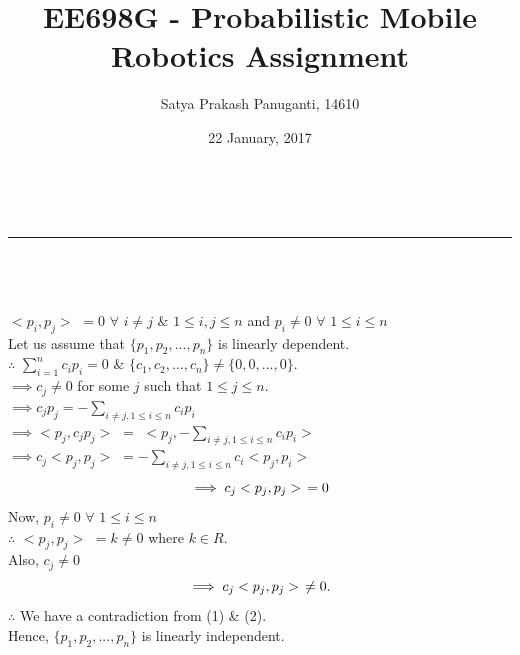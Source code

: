 \documentclass[a4paper,fleqn,11pt]{article}
\makeatletter
\newcommand{\linia}{\rule{\linewidth}{0.5pt}}
\theoremstyle{mytheor}
\renewcommand{\maketitle}{
\begin{center}
\vspace{2ex}
{\huge \textsc{\@title}}
\vspace{1ex}
\\
\linia\\
\@author \hfill \@date
\vspace{4ex}
\end{center}
}
\makeatother
\begin{document}
\title{EE698G - Probabilistic Mobile Robotics Assignment}

\author{Satya Prakash Panuganti, 14610}

\date{22 January, 2017}

\maketitle

\section{}
$<p_{i}, p_{j}>$ $= 0$ $\forall$ $i \neq j$ $\&$ $1 \leqslant i, j \leqslant n$ and $p_{i} \neq 0$ $\forall$ $1 \leqslant i \leqslant n$ \\
Let us assume that $\{p_{1}, p_{2}, ... , p_{n}\}$ is linearly dependent. \\
$\therefore$ \hspace{2ex}$ \sum_{i=1}^{n} c_{i}p_{i} = 0$ $\&$ $\{c_{1}, c_{2}, ... , c_{n}\} \neq \{0, 0, ... , 0\}.$ \\
$\implies c_{j} \neq 0$ for some $j$ such that $1 \leqslant j \leqslant n.$ \\
$\implies c_{j}p_{j} = - \sum_{i \neq j, 1 \leqslant i \leqslant n} c_{i}p_{i}$ \\
$\implies <p_{j}, c_{j}p_{j}>$ $=$ $<p_{j}, - \sum_{i \neq j, 1 \leqslant i \leqslant n} c_{i}p_{i}>$ \\
$\implies c_{j}<p_{j}, p_{j}>$ $= - \sum_{i \neq j, 1 \leqslant i \leqslant n} c_{i}<p_{j}, p_{i}>$
\begin{equation}
\implies c_{j}<p_{j}, p_{j}> \hspace{1ex} = 0
\end{equation}
Now, $p_{i} \neq 0$ $\forall$ $1 \leqslant i \leqslant n$ \\
$\therefore$ $<p_{j}, p_{j}>$ $= k \neq 0$ where $k \in \!R.$ \\
Also, $c_{j} \neq 0$ 
\begin{equation}
\implies c_{j}<p_{j}, p_{j}> \hspace{1ex} \neq 0.
\end{equation}
$\therefore$ We have a contradiction from (1) \& (2).\\
Hence, $\{p_{1}, p_{2}, ... , p_{n}\}$ is linearly independent.
\end{document}
